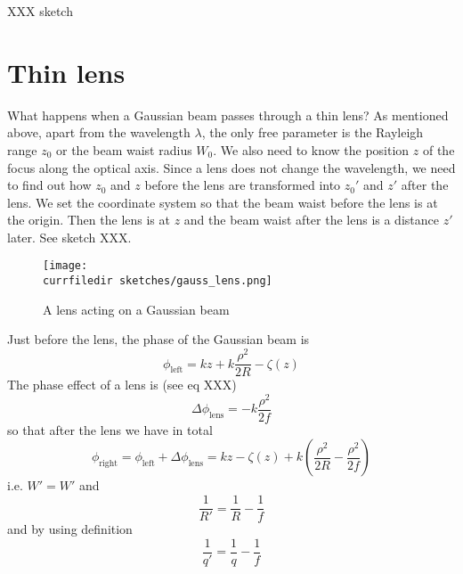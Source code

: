 XXX sketch

\section{Thin lens}

What happens when a Gaussian beam passes through a thin lens? As mentioned above, apart from the wavelength $\lambda$, the only free parameter is the Rayleigh range $z_0$ or the beam waist radius $W_0$. We also need to know the position $z$ of the focus along the optical axis. Since a lens does not change the wavelength, we need to find out how $z_0$ and $z$ before the lens are transformed into $z_0'$ and $z'$ after the lens. We set the coordinate system so that the beam waist before the lens is at the origin. Then the lens is at $z$ and the beam waist after the lens is a distance $z'$ later. See sketch XXX.

\begin{figure}
    \texttt{[image: \\currfiledir sketches/gauss\_lens.png]}
   \caption{A lens acting on a Gaussian beam}
\end{figure}



Just before the lens, the phase of the Gaussian beam is
\begin{equation}
   \phi_\text{left} =  k z + k  \frac{\rho^2}{2 R}  -  \zeta(z) 
\end{equation}
The phase effect of a lens is (see eq XXX)
\begin{equation}
  \Delta\phi_\text{lens} =   - k \frac{\rho^2}{2f}
\end{equation}
so that after the lens we have in total
\begin{equation}
  \phi_\text{right} =  \phi_\text{left}   + \Delta\phi_\text{lens}  =   k z   -  \zeta(z)  + k  \left( \frac{\rho^2}{2 R} - \frac{\rho^2}{2f} \right)
\end{equation}  
i.e. $W' = W'$ and
\begin{equation}
    \frac{1}{R'} = \frac{1}{R} - \frac{1}{f}
\end{equation}
and by using definition %
\begin{equation}
    \frac{1}{q'} = \frac{1}{q} - \frac{1}{f}
\end{equation}

